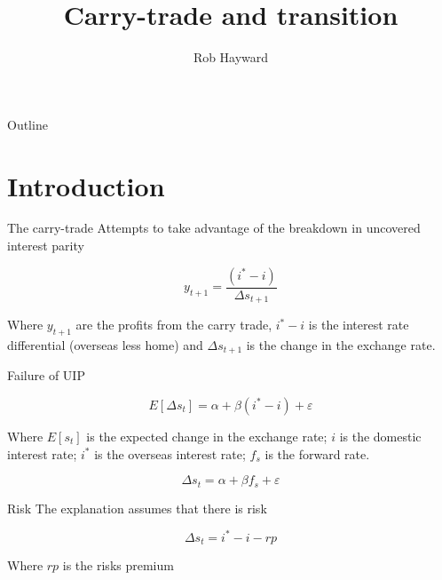 \documentclass[14pt,xcolor=pdftex,dvipsnames,table]{beamer}
\title{Carry-trade and transition}
\author{Rob Hayward}
\begin{document}
\begin{frame}
\titlepage
\end{frame}

\begin{frame}{Outline}
\tableofcontents
\end{frame}

\section{Introduction}
\begin{frame}{The carry-trade}
Attempts to take advantage of the breakdown in uncovered interest parity
\pause
\begin{block}{}
\begin{equation*}\label{eqref:carry}
y_{t+1} = \frac{(i^* - i)}{\Delta s_{t+1}}
\end{equation*}
\end{block}
Where $y_{t+1}$ are the profits from the carry trade, $i^* - i$ is the interest rate differential (overseas less home) and $\Delta s_{t+1}$ is the change in the exchange rate.    
\end{frame}

\begin{frame}{Failure of UIP}
\begin{block}{}
\begin{equation*}
E[\Delta s_t] = \alpha + \beta (i^* - i) + \varepsilon
\end{equation*}
\end{block}
\pause
Where $E[s_t]$ is the expected change in the exchange rate; $i$ is the domestic interest rate; $i^*$ is the overseas interest rate; $f_s$ is the forward rate. 
\begin{block}{}
\begin{equation*}
\Delta s_t = \alpha + \beta f_s + \varepsilon
\end{equation*}
\end{block}
\end{frame}

\begin{frame}{Risk}
The explanation assumes that there is risk
\pause
\begin{block}{}
\begin{equation*}
\Delta s_t = i^* - i - rp
\end{equation*}
\end{block}
\pause
Where $rp$ is the risks premium
\end{frame}
\end{document}
